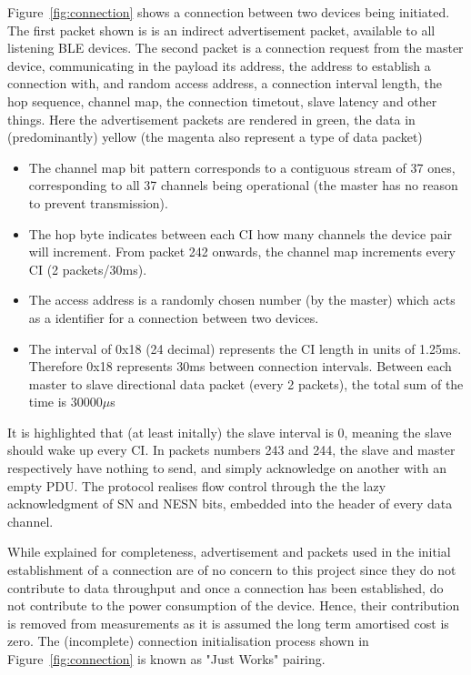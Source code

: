 \documentclass[]{article}
\begin{document}
Figure~\ref{fig:connection} shows a connection between two devices being initiated. The first packet shown is is an indirect advertisement packet, available to all listening \ac{BLE} devices. The second packet is a connection request from the master device, communicating in the payload its address, the address to establish a connection with, and random access address, a connection interval length, the hop sequence, channel map, the connection timetout, slave latency and other things. Here the advertisement packets are rendered in green, the data in (predominantly) yellow (the magenta also represent a type of data packet)
\begin{itemize}

 \item The channel map bit pattern corresponds to a contiguous stream of 37 ones, corresponding to all 37 channels being operational (the master has no reason to prevent transmission). 
 \item The hop byte indicates between each \ac{CI} how many channels the device pair will increment. From packet 242 onwards, the channel map increments every \ac{CI} (2 packets/30ms).
 \item The access address is a randomly chosen number (by the master) which acts as a identifier for a connection between two devices. 
 \item The interval of 0x18 (24 decimal) represents the \ac{CI} length in units of 1.25ms. Therefore 0x18 represents 30ms between connection intervals. Between each master to slave directional data packet (every 2 packets), the total sum of the time is 30000$\mu$s

\end{itemize}

It is highlighted that (at least initally) the slave interval is 0, meaning the slave should wake up every \ac{CI}. In packets numbers 243 and 244, the slave and master respectively have nothing to send, and simply acknowledge on another with an empty \ac{PDU}. The protocol realises flow control through the the lazy acknowledgment of \ac{SN} and \ac{NESN} bits, embedded into the header of every data channel.

While explained for completeness, advertisement and packets used in the initial establishment of a connection are of no concern to this project since they do not contribute to data throughput and once a connection has been established, do not contribute to the power consumption of the device. Hence, their contribution is removed from measurements as it is assumed the long term amortised cost is zero. The (incomplete) connection initialisation process shown in Figure~\ref{fig:connection} is known as "Just Works" pairing.
\end{document}
